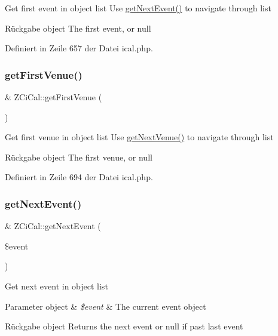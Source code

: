 Get first event in object list Use \mbox{\hyperlink{class_z_ci_cal_aa7e551ed399211dec2f63f4610e0ac1c}{get\+Next\+Event()}} to navigate through list

\begin{DoxyReturn}{Rückgabe}
object The first event, or null 
\end{DoxyReturn}


Definiert in Zeile 657 der Datei ical.\+php.

\mbox{\label{class_z_ci_cal_addfaf8b37c42f06213b22cdb2faceb67}} 
\subsubsection{\texorpdfstring{get\+First\+Venue()}{getFirstVenue()}}
{\footnotesize\ttfamily \& Z\+Ci\+Cal\+::get\+First\+Venue (\begin{DoxyParamCaption}{ }\end{DoxyParamCaption})}

Get first venue in object list Use \mbox{\hyperlink{class_z_ci_cal_a39f53526421aa7122720bd5fae17b886}{get\+Next\+Venue()}} to navigate through list

\begin{DoxyReturn}{Rückgabe}
object The first venue, or null 
\end{DoxyReturn}


Definiert in Zeile 694 der Datei ical.\+php.

\mbox{\label{class_z_ci_cal_aa7e551ed399211dec2f63f4610e0ac1c}} 
\subsubsection{\texorpdfstring{get\+Next\+Event()}{getNextEvent()}}
{\footnotesize\ttfamily \& Z\+Ci\+Cal\+::get\+Next\+Event (\begin{DoxyParamCaption}\item[{}]{\$event }\end{DoxyParamCaption})}

Get next event in object list


\begin{DoxyParams}[1]{Parameter}
object & {\em \$event} & The current event object\\
\hline
\end{DoxyParams}
\begin{DoxyReturn}{Rückgabe}
object Returns the next event or null if past last event 
\end{DoxyReturn}


